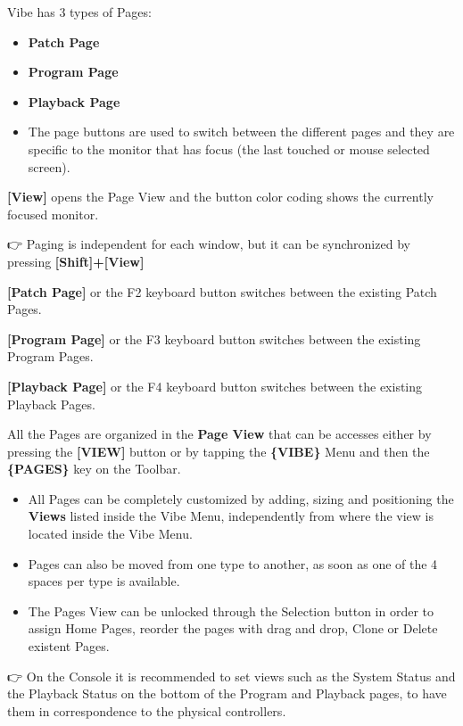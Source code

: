\documentclass[
]{article}
\begin{document}
Vibe has 3 types of Pages:

\begin{itemize}
\item
  \textbf{Patch Page}
\item
  \textbf{Program Page}
\item
  \textbf{Playback Page}
\item
  The page buttons are used to switch between the different pages and they are specific to the monitor that has focus (the last touched or mouse selected screen).
\end{itemize}

\textbf{{[}View{]}} opens the Page View and the button color coding shows the currently focused monitor.

👉 Paging is independent for each window, but it can be synchronized by pressing \textbf{{[}Shift{]}+{[}View{]}}

\textbf{{[}Patch Page{]}} or the F2 keyboard button switches between the existing Patch Pages.

\textbf{{[}Program Page{]}} or the F3 keyboard button switches between the existing Program Pages.

\textbf{{[}Playback Page{]}} or the F4 keyboard button switches between the existing Playback Pages.

All the Pages are organized in the \textbf{Page View} that can be accesses either by pressing the \textbf{{[}VIEW{]}} button or by tapping the \textbf{\{VIBE\}} Menu and then the \textbf{\{PAGES\}} key on the Toolbar.

\begin{itemize}
\item
  All Pages can be completely customized by adding, sizing and positioning the \textbf{Views} listed inside the Vibe Menu, independently from where the view is located inside the Vibe Menu.
\item
  Pages can also be moved from one type to another, as soon as one of the 4 spaces per type is available.
\item
  The Pages View can be unlocked through the Selection button in order to assign Home Pages, reorder the pages with drag and drop, Clone or Delete existent Pages.
\end{itemize}

👉 On the Console it is recommended to set views such as the System Status and the Playback Status on the bottom of the Program and Playback pages, to have them in correspondence to the physical controllers.
\end{document}
